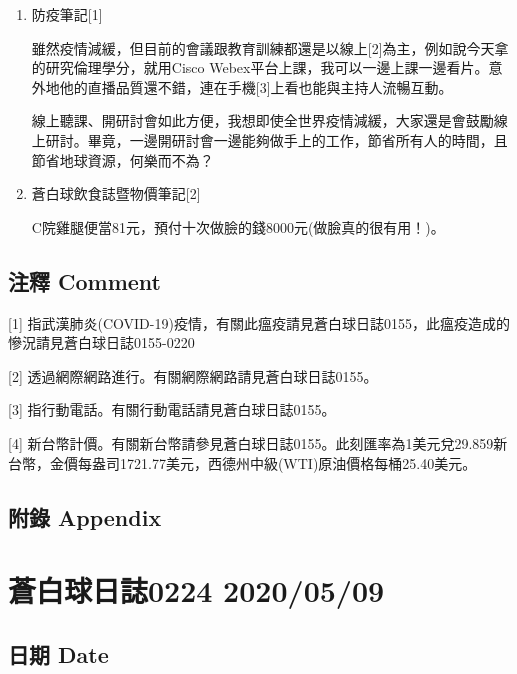 \documentclass[a5paper, 12pt
]{book}
\begin{document}
\begin{enumerate}
\def\labelenumi{\arabic{enumi}.}
\item
  防疫筆記{[}1{]}

  雖然疫情減緩，但目前的會議跟教育訓練都還是以線上{[}2{]}為主，例如說今天拿的研究倫理學分，就用Cisco
  Webex平台上課，我可以一邊上課一邊看片。意外地他的直播品質還不錯，連在手機{[}3{]}上看也能與主持人流暢互動。

  線上聽課、開研討會如此方便，我想即使全世界疫情減緩，大家還是會鼓勵線上研討。畢竟，一邊開研討會一邊能夠做手上的工作，節省所有人的時間，且節省地球資源，何樂而不為？
\item
  蒼白球飲食誌暨物價筆記{[}2{]}

  C院雞腿便當81元，預付十次做臉的錢8000元(做臉真的很有用！)。
\end{enumerate}

\hypertarget{ux6ce8ux91cb-comment-68}{%
\subsection{注釋 Comment}\label{ux6ce8ux91cb-comment-68}}

{[}1{]}
指武漢肺炎(COVID-19)疫情，有關此瘟疫請見蒼白球日誌0155，此瘟疫造成的慘況請見蒼白球日誌0155-0220

{[}2{]} 透過網際網路進行。有關網際網路請見蒼白球日誌0155。

{[}3{]} 指行動電話。有關行動電話請見蒼白球日誌0155。

{[}4{]}
新台幣計價。有關新台幣請參見蒼白球日誌0155。此刻匯率為1美元兌29.859新台幣，金價每盎司1721.77美元，西德州中級(WTI)原油價格每桶25.40美元。

\hypertarget{ux9644ux9304-appendix-68}{%
\subsection{附錄 Appendix}\label{ux9644ux9304-appendix-68}}

\hypertarget{ux84bcux767dux7403ux65e5ux8a8c0224-20200509}{%
\section{蒼白球日誌0224
2020/05/09}\label{ux84bcux767dux7403ux65e5ux8a8c0224-20200509}}

\hypertarget{ux65e5ux671f-date-69}{%
\subsection{日期 Date}\label{ux65e5ux671f-date-69}}
\end{document}
